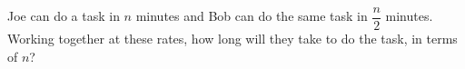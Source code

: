 Joe can do a task in $n$ minutes and Bob can do the same task in $\dfrac n2$ minutes. Working together at these rates, how long will they take to do the task, in terms of $n$?
